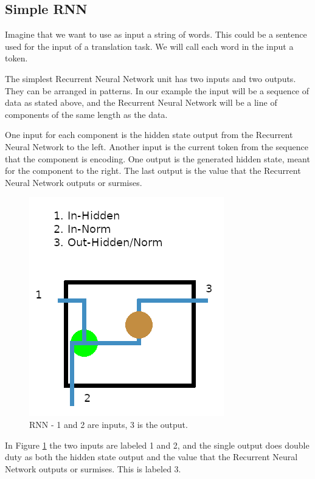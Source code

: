 \subsection{Simple RNN}

Imagine that we want to use as input a string of words. This could be a sentence used for the input of a translation task. We will call each word in the input a token.

The simplest Recurrent Neural Network unit has two inputs and two outputs. They can be arranged in patterns. In our example the input will be a sequence of data as stated above, and the Recurrent Neural Network will be a line of components of the same length as the data.

One input for each component is the hidden state output from the Recurrent Neural Network to the left. Another input is the current token from the sequence that the component is encoding. One output is the generated hidden state, meant for the component to the right. The last output is the value that the Recurrent Neural Network outputs or surmises. 

\begin{figure}[H]
	\begin{center}
	
	\includegraphics[scale=0.5]{diagram-rnn01}
		
	\end{center}
	\caption[Recurrent Neural Network]{RNN - 1 and 2 are inputs, 3 is the output.}
	\label{rnn-01}

\end{figure}

In Figure \ref{rnn-01} the two inputs are labeled 1 and 2, and the single output does double duty as both the hidden state output and the value that the Recurrent Neural Network outputs or surmises. This is labeled 3.

